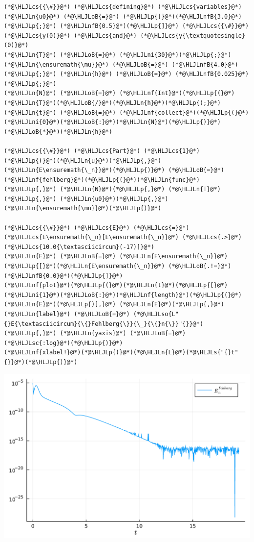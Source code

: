 \documentclass[12pt,a4paper]{article}
\newcommand{\HLJLn}[1]{#1}
\newcommand{\HLJLnf}[1]{\textcolor[RGB]{66,102,213}{#1}}
\newcommand{\HLJLs}[1]{\textcolor[RGB]{201,61,57}{#1}}
\newcommand{\HLJLsc}[1]{\textcolor[RGB]{201,61,57}{#1}}
\newcommand{\HLJLso}[1]{\textcolor[RGB]{201,61,57}{#1}}
\newcommand{\HLJLnfB}[1]{\textcolor[RGB]{59,151,46}{#1}}
\newcommand{\HLJLni}[1]{\textcolor[RGB]{59,151,46}{#1}}
\newcommand{\HLJLoB}[1]{\textcolor[RGB]{102,102,102}{\textbf{#1}}}
\newcommand{\HLJLp}[1]{#1}
\newcommand{\HLJLcs}[1]{\textcolor[RGB]{153,153,119}{\textit{#1}}}
\begin{document}
\begin{lstlisting}
(*@\HLJLcs{{\#}}@*) (*@\HLJLcs{defining}@*) (*@\HLJLcs{variables}@*)
(*@\HLJLn{u0}@*) (*@\HLJLoB{=}@*) (*@\HLJLp{[}@*)(*@\HLJLnfB{3.0}@*)(*@\HLJLp{;}@*) (*@\HLJLnfB{0.5}@*)(*@\HLJLp{]}@*) (*@\HLJLcs{{\#}}@*) (*@\HLJLcs{y(0)}@*) (*@\HLJLcs{and}@*) (*@\HLJLcs{y{\textquotesingle}(0)}@*)
(*@\HLJLn{T}@*) (*@\HLJLoB{=}@*) (*@\HLJLni{30}@*)(*@\HLJLp{;}@*) (*@\HLJLn{\ensuremath{\mu}}@*) (*@\HLJLoB{=}@*) (*@\HLJLnfB{4.0}@*)(*@\HLJLp{;}@*) (*@\HLJLn{h}@*) (*@\HLJLoB{=}@*) (*@\HLJLnfB{0.025}@*)(*@\HLJLp{;}@*)
(*@\HLJLn{N}@*) (*@\HLJLoB{=}@*) (*@\HLJLnf{Int}@*)(*@\HLJLp{(}@*)(*@\HLJLn{T}@*)(*@\HLJLoB{/}@*)(*@\HLJLn{h}@*)(*@\HLJLp{);}@*)
(*@\HLJLn{t}@*) (*@\HLJLoB{=}@*) (*@\HLJLnf{collect}@*)(*@\HLJLp{(}@*)(*@\HLJLni{0}@*)(*@\HLJLoB{:}@*)(*@\HLJLn{N}@*)(*@\HLJLp{)}@*)(*@\HLJLoB{*}@*)(*@\HLJLn{h}@*)

(*@\HLJLcs{{\#}}@*) (*@\HLJLcs{Part}@*) (*@\HLJLcs{1}@*)
(*@\HLJLp{(}@*)(*@\HLJLn{u}@*)(*@\HLJLp{,}@*) (*@\HLJLn{E\ensuremath{\_n}}@*)(*@\HLJLp{)}@*) (*@\HLJLoB{=}@*) (*@\HLJLnf{fehlberg}@*)(*@\HLJLp{(}@*)(*@\HLJLn{func}@*)(*@\HLJLp{,}@*) (*@\HLJLn{N}@*)(*@\HLJLp{,}@*) (*@\HLJLn{T}@*)(*@\HLJLp{,}@*) (*@\HLJLn{u0}@*)(*@\HLJLp{,}@*) (*@\HLJLn{\ensuremath{\mu}}@*)(*@\HLJLp{)}@*)

(*@\HLJLcs{{\#}}@*) (*@\HLJLcs{E}@*) (*@\HLJLcs{=}@*) (*@\HLJLcs{E\ensuremath{\_n}[E\ensuremath{\_n}}@*) (*@\HLJLcs{.>}@*) (*@\HLJLcs{10.0{\textasciicircum}(-17)]}@*)
(*@\HLJLn{E}@*) (*@\HLJLoB{=}@*) (*@\HLJLn{E\ensuremath{\_n}}@*)(*@\HLJLp{[}@*)(*@\HLJLn{E\ensuremath{\_n}}@*) (*@\HLJLoB{.!=}@*) (*@\HLJLnfB{0.0}@*)(*@\HLJLp{]}@*)
(*@\HLJLnf{plot}@*)(*@\HLJLp{(}@*)(*@\HLJLn{t}@*)(*@\HLJLp{[}@*)(*@\HLJLni{1}@*)(*@\HLJLoB{:}@*)(*@\HLJLnf{length}@*)(*@\HLJLp{(}@*)(*@\HLJLn{E}@*)(*@\HLJLp{)],}@*) (*@\HLJLn{E}@*)(*@\HLJLp{,}@*) (*@\HLJLn{label}@*) (*@\HLJLoB{=}@*) (*@\HLJLso{L"{}E{\textasciicircum}{\{}Fehlberg{\}}{\_}{\{}n{\}}"{}}@*)(*@\HLJLp{,}@*) (*@\HLJLn{yaxis}@*) (*@\HLJLoB{=}@*) (*@\HLJLsc{:log}@*)(*@\HLJLp{)}@*)
(*@\HLJLnf{xlabel!}@*)(*@\HLJLp{(}@*)(*@\HLJLn{L}@*)(*@\HLJLs{"{}t"{}}@*)(*@\HLJLp{)}@*)
\end{lstlisting}

\includegraphics[width=\linewidth]{figures/ass_2_report_6_1.pdf}
\end{document}
